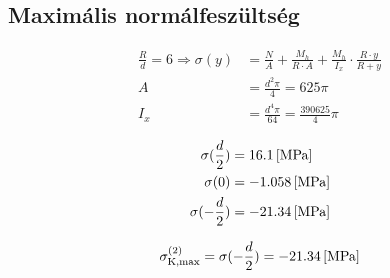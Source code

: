 \subsection{Maximális normálfeszültség}

\begin{align*}
	\frac{R}{d} = 6 \Rightarrow \sigma(y) &= \frac{N}{A} + \frac{M_h}{R\cdot A} + \frac{M_h}{I_x} \cdot \frac{R\cdot y}{R+y} \\
	A &= \frac{d^2 \pi}{4} = 625\pi \\
	I_x &= \frac{d^4 \pi}{64} = \frac{390625}{4}\pi
\end{align*}

\begin{align*}
	\sigma(\frac{d}{2}) &= \SI{16.1}{[\mega\pascal]} \\
	\sigma(0) &= \SI{-1.058}{[\mega\pascal]} \\
	\sigma(-\frac{d}{2}) &= \SI{-21.34}{[\mega\pascal]}
\end{align*}

\begin{equation*}
	\sigma^{(2)}_{\text{K,max}} = \sigma(-\frac{d}{2}) = \SI{-21.34}{[\mega\pascal]}
\end{equation*}

